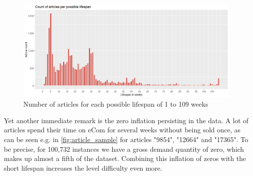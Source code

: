 \begin{figure}[H]
\centering
  \includegraphics[width=0.95\linewidth]{figures/article_lifespan.png}
  \caption{Number of articles for each possible lifespan of 1 to 109 weeks}
  \label{fig:article_lifespan}
\end{figure}



Yet another immediate remark is the zero inflation persisting in the data. A lot of articles spend their time on eCom for several weeks without being sold once, as can be seen e.g. in \autoref{fig:article_sample} for articles "9854", "12664" and "17365". To be precise, for 100,732 instances we have a gross demand quantity of zero, which makes up almost a fifth of the dataset. Combining this inflation of zeros with the short lifespan increases the level difficulty even more.






